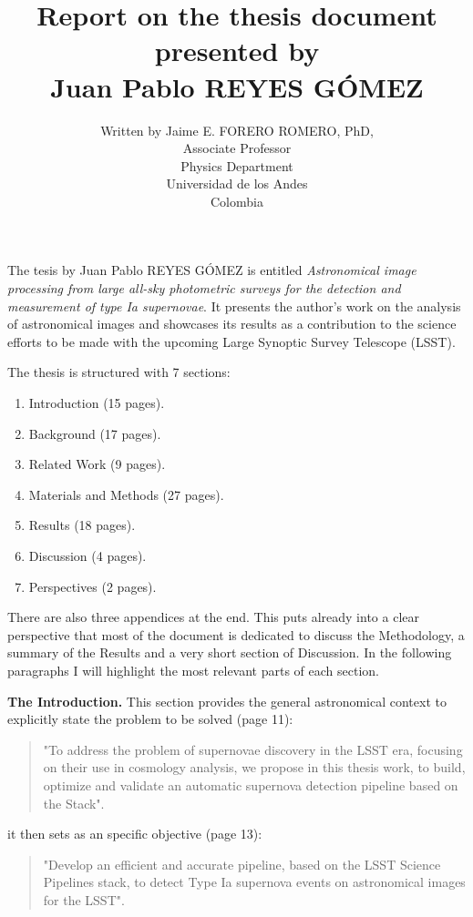 \documentclass{article}
\begin{document}
\title{Report on the thesis document presented by \\
Juan Pablo REYES G\'OMEZ}
\author{Written by Jaime E. FORERO ROMERO, PhD,\\
Associate Professor\\ Physics Department\\ Universidad de los Andes\\ Colombia}
\maketitle

The tesis by Juan Pablo REYES G\'OMEZ is entitled \emph{Astronomical image processing from large all-sky photometric surveys for the detection and measurement of type Ia supernovae}. 
It presents the author's work on the analysis of astronomical images and showcases its results as a contribution to the science efforts to be made with the upcoming Large Synoptic Survey Telescope (LSST).

The thesis is structured with 7 sections:
\begin{enumerate}
    \item Introduction (15 pages).
    \item Background (17 pages).
    \item Related Work (9 pages).
    \item Materials and Methods (27 pages).
    \item Results (18 pages).
    \item Discussion (4 pages).
    \item Perspectives (2 pages).
\end{enumerate}

There are also three appendices at the end. This puts already into a clear perspective that most of the document is dedicated to discuss the Methodology, a summary of the Results and a very short section of Discussion.
In the following paragraphs I will highlight the most relevant parts of each section.


{\bf The Introduction.} This section provides the general astronomical context to explicitly state the problem to be solved (page 11):
\begin{quote}
   "To address the problem of supernovae discovery in the LSST era, focusing on their use in cosmology analysis, we propose in this thesis work, to build, optimize and validate an automatic supernova detection pipeline based on the Stack". 
\end{quote}
it then sets as an specific objective (page 13):
\begin{quote}
    "Develop an efficient and accurate pipeline, based on the LSST Science Pipelines stack, to detect Type Ia supernova events on astronomical images for the LSST".
\end{quote}
\end{document}
